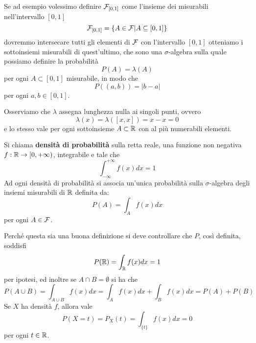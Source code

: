 Se ad esempio volessimo definire $\mathcal{F}_{[0,1]}$ come l'insieme dei misurabili nell'intervallo $[0,1]$
\[ \mathcal{F}_{[0,1]} = \{ A \in \mathcal{F} | A \subseteq [0,1] \} \]
dovremmo intersecare tutti gli elementi di $\mathcal{F}$ con l'intervallo $[0,1]$ otteniamo i sottoinsiemi
misurabili di quest'ultimo, che sono una $\sigma$-algebra sulla quale possiamo definire la
probabilità
\[ P (A) = \lambda (A) \]
per ogni $A \subset [0,1]$ misurabile, in modo che
\[ P((a, b)) = |b - a| \]
per ogni $a,b \in [0,1]$.

\begin{observation}
	Osserviamo che $\lambda$ assegna lunghezza nulla ai singoli punti, ovvero
	\[ \lambda(x) = \lambda([x,x]) = x - x = 0 \]
	e lo stesso vale per ogni sottoinsieme $A \subset \mathbb{R}$ con al più numerabili elementi.
\end{observation}

\begin{definition}
	Si chiama \textbf{densità di probabilità} sulla retta reale, una funzione non negativa
	$f : \mathbb{R} \to [0, +\infty)$, integrabile e tale che
	\[ \int_{-\infty}^{+\infty} f(x) dx = 1 \]
	Ad ogni densità di probabilità si associa un'unica probabilità sulla $\sigma$-algebra degli
	insiemi misurabili di $\mathbb{R}$ definita da:
	\[ P(A) = \int_A f(x) dx \]
	per ogni $A \in \mathcal{F}$.
\end{definition}

Perché questa sia una buona definizione si deve controllare che $P$, così definita, soddisfi
\[ P(\mathbb{R}) = \int_{\mathbb{R}} f(x) dx = 1 \]
per ipotesi, ed inoltre se $A \cap B = \emptyset$ si ha che
\[ P(A \cup B) = \int_{A \cup B} f(x) dx = \int_A f(x) dx + \int_B f(x) dx = P(A) + P(B) \]
Se $X$ ha densità $f$, allora vale
\[ P(X = t) = P_X (t) = \int_{\{t\}} f(x) dx = 0 \]
per ogni $t \in \mathbb{R}$.